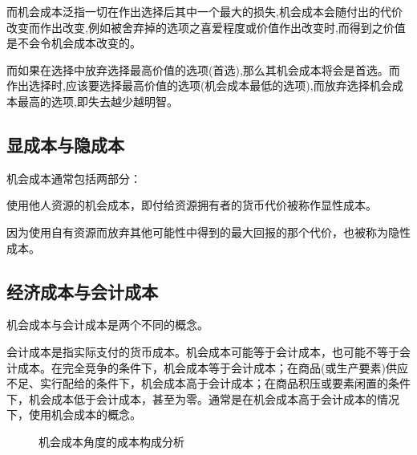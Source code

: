 而机会成本泛指一切在作出选择后其中一个最大的损失,机会成本会随付出的代价改变而作出改变,例如被舍弃掉的选项之喜爱程度或价值作出改变时,而得到之价值是不会令机会成本改变的。

而如果在选择中放弃选择最高价值的选项(首选),那么其机会成本将会是首选。而作出选择时,应该要选择最高价值的选项(机会成本最低的选项),而放弃选择机会成本最高的选项,即失去越少越明智。

\subsection{显成本与隐成本}

机会成本通常包括两部分：
\begin{asparaenum}
\item 使用他人资源的机会成本，即付给资源拥有者的货币代价被称作显性成本。
\item 因为使用自有资源而放弃其他可能性中得到的最大回报的那个代价，也被称为隐性成本。
\end{asparaenum}

\subsection{经济成本与会计成本}

机会成本与会计成本是两个不同的概念。

会计成本是指实际支付的货币成本。机会成本可能等于会计成本，也可能不等于会计成本。在完全竞争的条件下，机会成本等于会计成本；在商品(或生产要素)供应不足、实行配给的条件下，机会成本高于会计成本；在商品积压或要素闲置的条件下，机会成本低于会计成本，甚至为零。通常是在机会成本高于会计成本的情况下，使用机会成本的概念。
\begin{figure}[!h]
\colorbox{black!3}{\parbox{\linewidth-2\fboxsep}{%
\centering
{}
\caption{机会成本角度的成本构成分析}
\label{fig:cost-structure-analysis-with-opportunity-cost}
}}
\end{figure}

